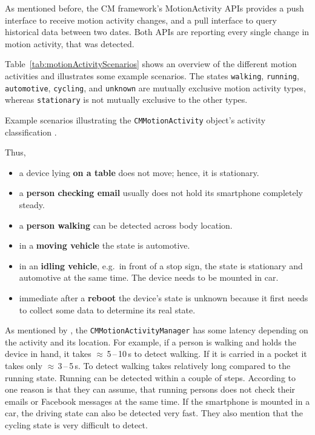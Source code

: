 As mentioned before, the \ac{CM} framework's MotionActivity \acsp{API} provides a push interface to receive motion activity changes, and a pull interface to query historical data between two dates. Both \acsp{API} are reporting every single change in motion activity, that was detected.

Table~\ref{tab:motionActivityScenarios} shows an overview of the different motion activities and illustrates some example scenarios. The states \texttt{walking}, \texttt{running}, \texttt{automotive}, \texttt{cycling}, and \texttt{unknown} are mutually exclusive motion activity types, whereas \texttt{stationary} is not mutually exclusive to the other types.

\begin{table}
	
	\caption{Example scenarios illustrating the \texttt{CMMotionActivity} object's activity classification \citep{apple:wwdc_2014_pham}.}
	\label{tab:motionActivityScenarios}
\end{table}


\noindent Thus,
\begin{itemize}
  \item a device lying \textbf{on a table} does not move; hence, it is stationary.
  \item a \textbf{person checking email}  usually does not hold its smartphone completely steady.
  \item a \textbf{person walking} can be detected across body location.
  \item in a \textbf{moving vehicle} the state is automotive.
  \item in an \textbf{idling vehicle}, e.g.\ in front of a stop sign, the state is stationary and automotive at the same time. The device needs to be mounted in car.

  \item immediate after a \textbf{reboot} the device's state is unknown because it first needs to collect some data to determine its real state.
\end{itemize}

\noindent As mentioned by \citet{apple:wwdc_2014_pham}, the \texttt{CMMotionActivityManager} has some latency depending on the activity and its location. For example, if a person is walking and holds the device in hand, it takes $\approx$\,5\,--\,10\,s to detect walking. If it is carried in a pocket it takes only $\approx$\,3\,--\,5\,s. To detect walking takes relatively long compared to the running state. Running can be detected within a couple of steps. According to \citet{apple:wwdc_2014_pham} one reason is that they can assume, that running persons does not check their emails or Facebook messages at the same time. If the smartphone is mounted in a car, the driving state can also be detected very fast. They also mention that the cycling state is very difficult to detect.

